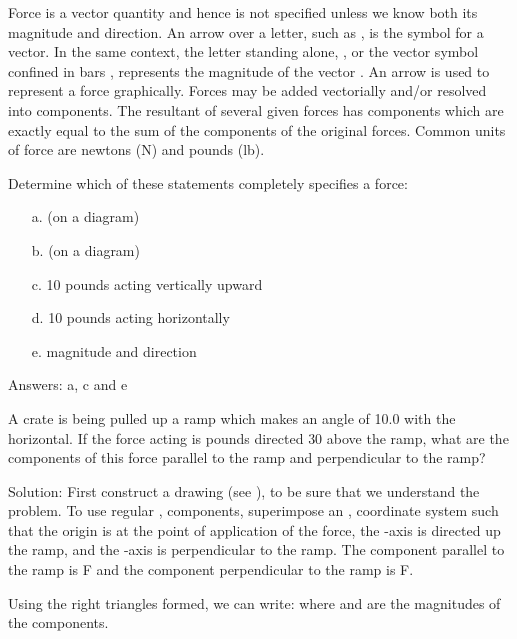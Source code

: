{{
Force is a vector quantity and hence is not specified unless we
know both its magnitude and direction.
An arrow over a letter, such as , is the symbol for a vector.
In the same context, the letter standing alone, , or the vector symbol
confined in bars , represents the magnitude of the vector .
An arrow is used to represent a force graphically.
Forces may be added vectorially and/or resolved into components.
The resultant of several given forces has components which are exactly equal
to the sum of the components of the original forces.
Common units of force are newtons (N) and pounds (lb).

Determine which of these statements completely specifies a force:
\begin{itemize}
\item [a.]  (on a diagram)
\item [b.]  (on a diagram)
\item [c.] 10 pounds acting vertically upward
\item [d.] 10 pounds acting horizontally
\item [e.] magnitude and direction
\end{itemize}
Answers: a, c and e


A crate is being pulled up a ramp which makes an angle of {10.0\degrees} with
the horizontal.
If the force acting is  pounds directed
{30\degrees} above the ramp, what are the components of this force
parallel to the ramp and perpendicular to the ramp?

Solution: First construct a drawing (see ), to be sure that
we understand the problem.
To use regular , components, superimpose an ,
coordinate system such that the origin is at the point of
application of the force, the -axis is directed up the ramp, and
the -axis is perpendicular to the ramp.
The component parallel to the ramp is F and the
component perpendicular to the ramp is F.

Using the right triangles formed, we can write:
%
%
where  and  are the magnitudes of the components.

}}
